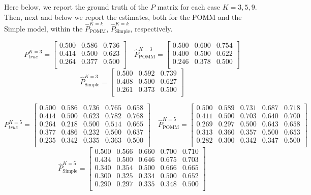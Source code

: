 \documentclass[11pt]{amsart}
\begin{document}
Here below, we report the ground truth of the $P$ matrix for each case $K=3,5,9$. Then, next and below we report the estimates, both for the POMM and the Simple model, within the $\hat{P}^{K=k}_{\text{POMM}}$, $\hat{P}^{K=k}_{\text{Simple}}$, respectively.

\newpage
\[
P^{K=3}_{true} = 
\left[\begin{array}{ccc}
0.500 & 0.586 & 0.736 \\
0.414 & 0.500 & 0.623 \\
0.264 & 0.377 & 0.500 \\
\end{array}\right] \quad 
\hat{P}^{K=3}_{\text{POMM}} = 
\left[\begin{array}{ccc}
0.500 & 0.600 & 0.754 \\
0.400 & 0.500 & 0.622 \\
0.246 & 0.378 & 0.500 \\
\end{array}\right] 
\]
\[ 
\hat{P}^{K=3}_{\text{Simple}} = 
\left[\begin{array}{ccc}
0.500 & 0.592 & 0.739 \\
0.408 & 0.500 & 0.627 \\
0.261 & 0.373 & 0.500 \\ 
\end{array}\right]
\]

\[
P^{K=5}_{true} = 
\left[\begin{array}{ccccc}
0.500 & 0.586 & 0.736 & 0.765 & 0.658 \\
0.414 & 0.500 & 0.623 & 0.782 & 0.768 \\
0.264 & 0.218 & 0.500 & 0.514 & 0.665 \\
0.377 & 0.486 & 0.232 & 0.500 & 0.637 \\
0.235 & 0.342 & 0.335 & 0.363 & 0.500 \\
\end{array}\right] \quad 
\hat{P}^{K=5}_{\text{POMM}} = 
\left[\begin{array}{ccccc}
0.500 & 0.589 & 0.731 & 0.687 & 0.718 \\
0.411 & 0.500 & 0.703 & 0.640 & 0.700 \\
0.269 & 0.297 & 0.500 & 0.643 & 0.658 \\
0.313 & 0.360 & 0.357 & 0.500 & 0.653 \\
0.282 & 0.300 & 0.342 & 0.347 & 0.500 \\
\end{array}\right] 
\]
\[ 
\hat{P}^{K=5}_{\text{Simple}} = 
\left[\begin{array}{ccccc}
0.500 & 0.566 & 0.660 & 0.700 & 0.710 \\
0.434 & 0.500 & 0.646 & 0.675 & 0.703 \\
0.340 & 0.354 & 0.500 & 0.666 & 0.665 \\
0.300 & 0.325 & 0.334 & 0.500 & 0.652 \\
0.290 & 0.297 & 0.335 & 0.348 & 0.500 \\
\end{array}\right]
\]
\end{document}

